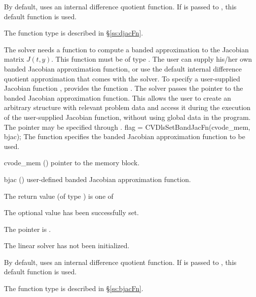 {
  By default, {\cvdense} uses an internal difference quotient function.
  If  is passed to , this default function is used.

  The function type  is described in \S\ref{ss:djacFn}.
}
The 
{\cvband} solver needs a function to compute a banded approximation to
the Jacobian matrix $J(t,y)$.  This function must be of type . 
The user can supply his/her own banded Jacobian approximation function, 
or use the default internal difference quotient approximation
that comes with the {\cvband} solver.
To specify a user-supplied Jacobian function , 
{\cvband} provides the function .
The {\cvband} solver passes the pointer 
to the banded Jacobian approximation function. This allows the user to
create an arbitrary structure with relevant problem data and access it
during the execution of the user-supplied Jacobian function, without
using global data in the program.  
The pointer  may be specified through .
{
  flag = CVDlsSetBandJacFn(cvode\_mem, bjac);
}
{
  The function  specifies the banded Jacobian
  approximation function to be used.
}
{
  \begin{args}
  \item[cvode\_mem] ()
    pointer to the {\cvode} memory block.
  \item[bjac] ()
    user-defined banded Jacobian approximation function.
  \end{args}
}
{
  The return value  (of type ) is one of
  \begin{args}
  \item[\Id{CVDLS\_SUCCESS}] 
    The optional value has been successfully set.
  \item[\Id{CVDLS\_MEM\_NULL}]
    The  pointer is .
  \item[\Id{CVDLS\_LMEM\_NULL}]
    The {\cvband} linear solver has not been initialized.
  \end{args}
}
{
  By default, {\cvband} uses an internal difference quotient function.
  If  is passed to , this default function is used.

  The function type  is described in \S\ref{ss:bjacFn}.
}


